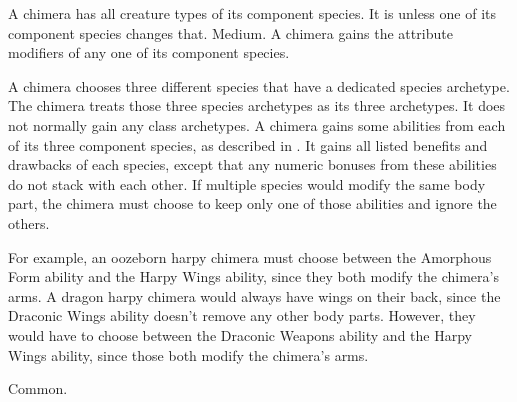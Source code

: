    A chimera has all creature types of its component species. It is  unless one of its component species changes that.
   Medium.
   A chimera gains the attribute modifiers of any one of its component species.
  \begin{raggeditemize}
     A chimera chooses three different species that have a dedicated species archetype.
      The chimera treats those three species archetypes as its three archetypes.
      It does not normally gain any class archetypes.
     A chimera gains some abilities from each of its three component species, as described in .
    It gains all listed benefits and drawbacks of each species, except that any numeric bonuses from these abilities do not stack with each other.
    If multiple species would modify the same body part, the chimera must choose to keep only one of those abilities and ignore the others.

    For example, an oozeborn harpy chimera must choose between the Amorphous Form ability and the Harpy Wings ability, since they both modify the chimera's arms.
    A dragon harpy chimera would always have wings on their back, since the Draconic Wings ability doesn't remove any other body parts.
    However, they would have to choose between the Draconic Weapons ability and the Harpy Wings ability, since those both modify the chimera's arms.
  \end{raggeditemize}
   Common.

